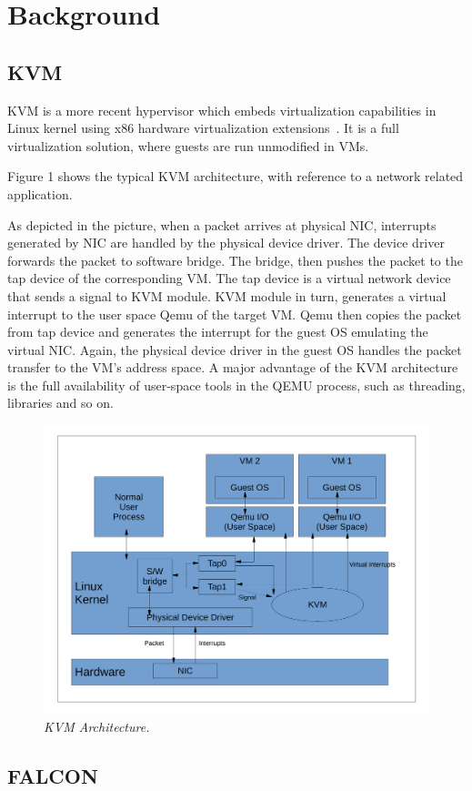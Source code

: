 \section{Background} \label{sec:background}

\subsection{KVM} \label{sec:kvm}

KVM is a more recent hypervisor which embeds virtualization capabilities 
in Linux kernel using x86 hardware virtualization extensions~\cite{kivity2007kvm}. 
It is a full virtualization solution, where guests are run unmodified in VMs. 

Figure 1 shows the typical KVM architecture, with reference to a network related
application. 

As depicted in the picture, when a packet arrives at physical NIC,
interrupts generated by NIC are handled by the physical device driver. The device
driver forwards the packet to software bridge. The bridge, then pushes the packet
to the tap device of the corresponding VM. The tap device is a virtual network
device that sends a signal to KVM module. KVM module in turn, generates a virtual
interrupt to the user space Qemu of the target VM. Qemu then copies the packet from
tap device and generates the interrupt for the guest OS emulating the virtual NIC.
Again, the physical device driver in the guest OS handles the packet transfer to
the VM’s address space. A major advantage of the KVM architecture is the full
availability of user-space tools in the QEMU process, such as threading, libraries
and so on.

\begin{figure}[t]
\centering
\includegraphics[width=.47\textwidth]{figures/kvm}
\vspace{-.2in}
\caption{{\em KVM Architecture.}} \label{fig:kvm}
\vspace{.05in}
\end{figure}

\subsection{FALCON} \label{sec:falcon}

